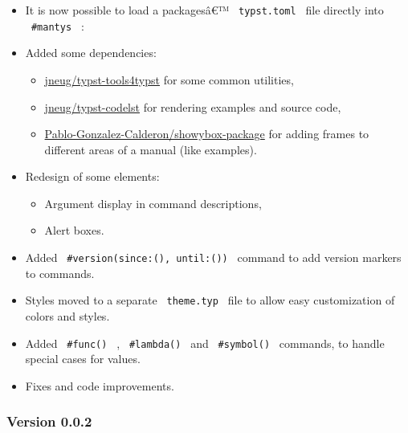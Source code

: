 \begin{itemize}
\item
  It is now possible to load a packagesâ€™ \texttt{\ typst.toml\ } file
  directly into \texttt{\ \#mantys\ } :

\begin{Shaded}
\begin{Highlighting}[]
\end{Highlighting}
\end{Shaded}
\item
  Added some dependencies:

  \begin{itemize}
  \tightlist
  \item
    \href{https://github.com/jneug/typst-tools4typst}{jneug/typst-tools4typst}
    for some common utilities,
  \item
    \href{https://github.com/jneug/typst-codelst}{jneug/typst-codelst}
    for rendering examples and source code,
  \item
    \href{https://github.com/Pablo-Gonzalez-Calderon/showybox-package}{Pablo-Gonzalez-Calderon/showybox-package}
    for adding frames to different areas of a manual (like examples).
  \end{itemize}
\item
  Redesign of some elements:

  \begin{itemize}
  \tightlist
  \item
    Argument display in command descriptions,
  \item
    Alert boxes.
  \end{itemize}
\item
  Added \texttt{\ \#version(since:(),\ until:())\ } command to add
  version markers to commands.
\item
  Styles moved to a separate \texttt{\ theme.typ\ } file to allow easy
  customization of colors and styles.
\item
  Added \texttt{\ \#func()\ } , \texttt{\ \#lambda()\ } and
  \texttt{\ \#symbol()\ } commands, to handle special cases for values.
\item
  Fixes and code improvements.
\end{itemize}

\subsubsection{Version 0.0.2}\label{version-0.0.2}

